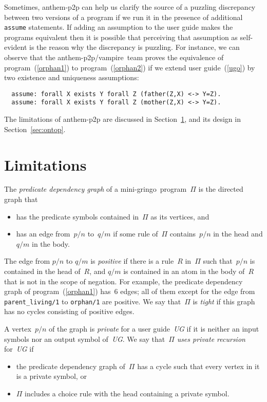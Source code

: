 \documentclass{tlp}
\def\gringo{{\sc gringo}}
\def\vampire{{\sc vampire}}
\begin{document}
Sometimes, {\sc anthem-p2p} can 
help us clarify the source of a puzzling discrepancy between two versions
of a program if we run it in the presence of additional \verb|assume|
statements.  If
adding an assumption to the user guide makes the programs equivalent then
it is possible that perceiving that assumption as self-evident
is the reason why the discrepancy is puzzling.  For
instance, we can observe that
the {\sc anthem-p2p}/\vampire\ team
proves the equivalence of
program~(\ref{orphan1}) to program~(\ref{orphan2}) if we extend user
guide~(\ref{ugo}) by two existence and uniqueness assumptions:
\begin{verbatim}
  assume: forall X exists Y forall Z (father(Z,X) <-> Y=Z).
  assume: forall X exists Y forall Z (mother(Z,X) <-> Y=Z).
\end{verbatim}

The limitations of {\sc anthem-p2p} are discussed in Section~\ref{sec:lim},
and its design in Section~\ref{sec:ontop}.

\section{Limitations}\label{sec:lim}

The \emph{predicate dependency graph} of a mini-\gringo\
program~$\Pi$ \cite[Section~6.3]{fan20} is the directed graph that
\begin{itemize}
\item has the predicate symbols contained in~$\Pi$ as its vertices, and
\item has an edge from~$p/n$ to~$q/m$ if some rule of~$\Pi$
  contains~$p/n$ in the head and $q/m$ in the body.
\end{itemize}
The edge from $p/n$ to $q/m$ is \emph{positive} if there is a rule~$R$
in~$\Pi$ such that~$p/n$ is contained in the head of~$R$, and $q/m$ is
contained in an atom in the body of~$R$ that is not in the scope of
negation.  For example, the predicate dependency graph
of program~(\ref{orphan1}) has~6 edges; all of them except for the edge
from \verb|parent_living/1| to \verb|orphan/1| are positive.
We say that~$\Pi$ is \emph{tight} if this graph has no
cycles consisting of positive edges.

A vertex~$p/n$ of the graph is \emph{private} for a user
guide~\emph{UG} if it is neither an input symbols nor an output
symbol of~\emph{UG}.  We say that~$\Pi$ \emph{uses private recursion}
for~\emph{UG} if
\begin{itemize}
\item the predicate dependency graph of~$\Pi$ has a cycle such that
  every vertex in it is a private symbol, or
\item $\Pi$ includes a choice rule with the head containing a private
  symbol.
\end{itemize}
\end{document}
